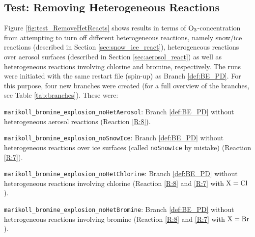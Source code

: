 



\subsection{Test: Removing Heterogeneous Reactions}

Figure \ref{fig:test_RemoveHetReacts} shows results in terms of $\mathrm{O_3}$-concentration from attempting to turn off different heterogeneous reactions, namely snow/ice reactions (described in Section \ref{sec:snow_ice_react}), heterogeneous reactions over aerosol surfaces (described in Section \ref{sec:aerosol_react}) as well as heterogeneous reactions involving chlorine and bromine, respectively. The runs were initiated with the same restart file (spin-up) as Branch \ref{def:BE_PD}. For this purpose, four new branches were created (for a full overview of the branches, see Table \ref{tab:branches}). These were:

\begin{mydef}\label{def:BE_PD_noAerosol}
    \texttt{marikoll\_bromine\_explosion\_noHetAerosol}: Branch \ref{def:BE_PD} without heterogeneous aerosol reactions (Reaction \ref{R:8}). 
\end{mydef}

\begin{mydef}\label{def:BE_PD_noIce}
    \texttt{marikoll\_bromine\_explosion\_noSnowIce}: Branch \ref{def:BE_PD} without heterogeneous reactions over ice surfaces (called \texttt{noSnowIce} by mistake) (Reaction \ref{R:7}).
\end{mydef}

\begin{mydef}\label{def:BE_PD_noCl}
    \texttt{marikoll\_bromine\_explosion\_noHetChlorine}: Branch \ref{def:BE_PD} without heterogeneous reactions involving chlorine (Reaction \ref{R:8} and \ref{R:7} with $\mathrm{X} = \mathrm{Cl}$).
\end{mydef}

\begin{mydef}\label{def:BE_PD_noBr}
    \texttt{marikoll\_bromine\_explosion\_noHetBromine}: Branch \ref{def:BE_PD} without heterogeneous reactions involving bromine (Reaction \ref{R:8} and \ref{R:7} with $\mathrm{X} = \mathrm{Br}$).
\end{mydef}








